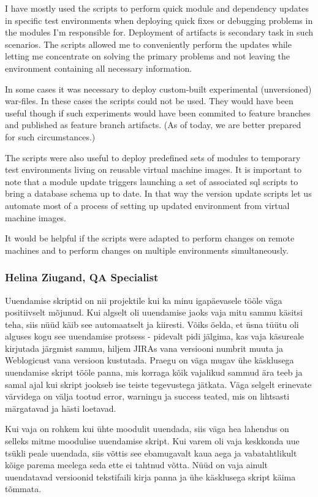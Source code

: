 \documentclass[12pt]{report}
\begin{document}
  I have mostly used the scripts to perform quick module and dependency updates in specific test environments when deploying quick fixes or debugging problems in the modules I'm responsible for. Deployment of artifacts is secondary task in such scenarios. The scripts allowed me to conveniently perform the updates while letting me concentrate on solving the primary problems and not leaving the environment containing all necessary information.

In some cases it was necessary to deploy custom-built experimental (unversioned) war-files. In these cases the scripts could not be used.
They would have been useful though if such experiments would have been commited to feature branches and published as feature branch artifacts. (As of today, we are better prepared for such circumstances.)

The scripts were also useful to deploy predefined sets of modules to temporary test environments living on reusable virtual machine images. It is important to note that a module update triggers launching a set of associated sql scripts to bring a database schema up to date. In that way the version update scripts let us automate most of a process of setting up updated environment from virtual machine images.

It would be helpful if the scripts were adapted to perform changes on remote machines and to perform changes on multiple environments simultaneously.

  \subsubsection{Helina Ziugand, QA Specialist}
  
  Uuendamise skriptid on nii projektile kui ka minu igapäevasele tööle väga positiivselt mõjunud. 
Kui algselt oli uuendamise jaoks vaja mitu sammu käsitsi teha, siis nüüd käib see automaatselt ja kiiresti. Võiks öelda, et üsna tüütu oli alguses kogu see uuendamise protsess - pidevalt pidi jälgima, kas vaja käsureale kirjutada järgmist sammu, hiljem JIRAs vana versiooni numbrit muuta ja Weblogicust vana versioon kustutada. Praegu on väga mugav ühe käsklusega uuendamise skript tööle panna, mis korraga kõik vajalikud sammud ära teeb ja samal ajal kui skript jookseb ise teiste tegevustega jätkata. Väga selgelt erinevate värvidega on välja tootud error, warningu ja success teated, mis on lihtsasti märgatavad ja hästi loetavad. 

Kui vaja on rohkem kui ühte moodulit uuendada, siis väga hea lahendus on selleks mitme moodulise uuendamise skript. Kui varem oli vaja keskkonda uue tsükli peale uuendada, siis võttis see ebamugavalt kaua aega ja vabatahtlikult kõige parema meelega seda ette ei tahtnud võtta. Nüüd on vaja ainult uuendatavad versioonid tekstifaili kirja panna ja ühe käsklusega skript käima tõmmata. 
\end{document}
